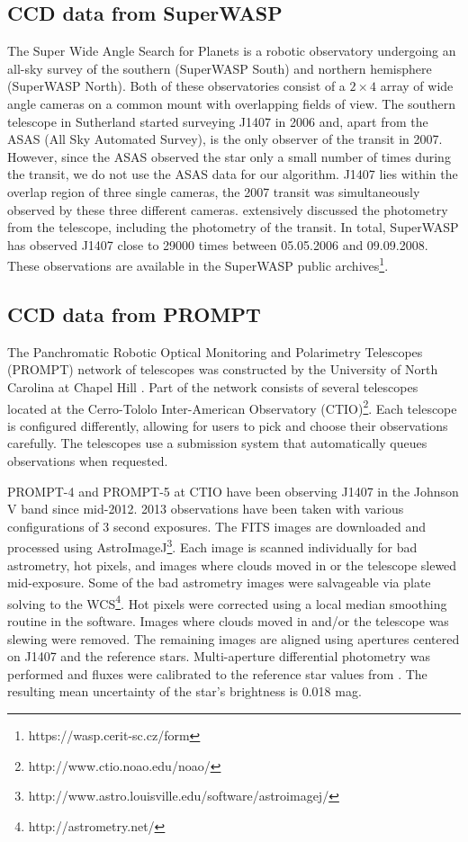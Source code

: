 \documentclass[twocolumn]{aa}
\begin{document}
\subsection{CCD data from SuperWASP}

The Super Wide Angle Search for Planets \citep{Butters10,Pollacco06} is a robotic observatory undergoing an all-sky survey of the southern (SuperWASP South) and northern hemisphere (SuperWASP North).
%
Both of these observatories consist of a $2\times4$ array of wide angle
cameras on a common mount with overlapping fields of view.
%
The southern telescope in Sutherland started surveying J1407 in 2006
and, apart from the ASAS (All Sky Automated Survey), is the only
observer of the transit in 2007.
%
However, since the ASAS observed the star only a small number of times during the transit, we do not use the ASAS data for our algorithm.
%
J1407 lies within the overlap region of three single cameras, the 2007 transit was simultaneously observed by these three different cameras.
%
\citet{Mamajek12,vanWerkhoven14} extensively discussed the photometry from the telescope, including the photometry of the transit.
%
In total, SuperWASP has observed J1407 close to 29000 times between 05.05.2006 and 09.09.2008.
%
These observations are available in the SuperWASP public archives\footnote{https://wasp.cerit-sc.cz/form}.

\subsection{CCD data from PROMPT}
%
The Panchromatic Robotic Optical Monitoring and Polarimetry Telescopes (PROMPT) network of telescopes was constructed by the University of North Carolina at Chapel Hill \citep{Reichart05}.
%
Part of the network consists of several telescopes located at the Cerro-Tololo Inter-American Observatory (CTIO)\footnote{http://www.ctio.noao.edu/noao/}.
%
Each telescope is configured differently, allowing for users to pick and choose their observations carefully.
%
The telescopes use a submission system that automatically queues observations when requested.

PROMPT-4 and PROMPT-5 at CTIO have been observing J1407 in the Johnson V band since mid-2012.
%
2013 observations have been taken with various configurations of 3 second exposures.
%
The FITS images are downloaded and processed using AstroImageJ\footnote{http://www.astro.louisville.edu/software/astroimagej/}.
%
Each image is scanned individually for bad astrometry, hot pixels, and images where clouds moved in or the telescope slewed mid-exposure.
%
Some of the bad astrometry images were salvageable via plate solving to the WCS\footnote{http://astrometry.net/}.
%
Hot pixels were corrected using a local median smoothing routine in the software.
%
Images where clouds moved in and/or the telescope was slewing were removed.
%
The remaining images are aligned using apertures centered on J1407 and the reference stars.
%
Multi-aperture differential photometry was performed and fluxes were calibrated to the reference star values from \citet{Kenworthy15}.
%
The resulting mean uncertainty of the star's brightness is 0.018 mag.
\end{document}
